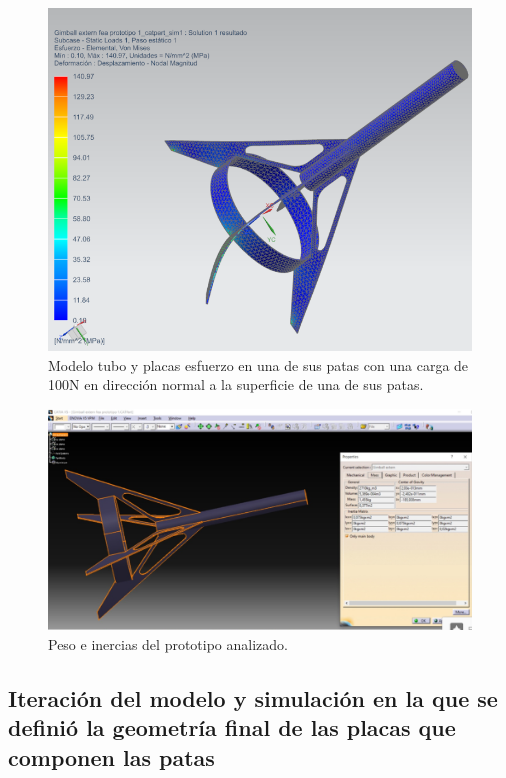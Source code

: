 \begin{figure}[htb]
    \centering
    \includegraphics[height=0.3\pdfpageheight]{fig/fea/tuboplaca5.png}
    \caption{Modelo tubo y placas esfuerzo en una de sus patas con una carga de 100N en dirección normal a la superficie de una de sus patas.}
    \label{fig:fea/tuboplaca5}
\end{figure}

\begin{figure}[htb]
    \centering
    \includegraphics[height=0.27\pdfpageheight]{fig/fea/inercias}
    \caption{Peso e inercias del prototipo analizado.}
    \label{fig:fea/tuboplacainercias}
\end{figure}

\null\newpage
\clearpage

\subsection{Iteración del modelo y simulación en la que se definió la geometría final de las placas que componen las patas}

